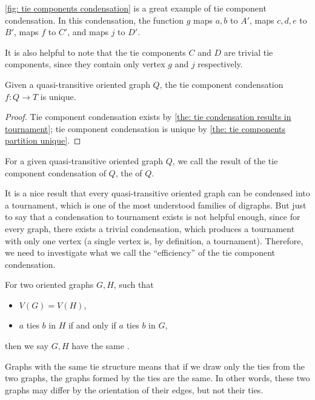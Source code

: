 \cref{fig: tie components condensation} is a great example of
tie component condensation.
In this condensation, the function \(g\) maps \(a, b\) to \(A'\),
maps \(c, d, e\) to \(B'\), maps \(f\) to \(C'\),
and maps \(j\) to \(D'\).

It is also helpful to note that the tie components \(C\) and \(D\)
are trivial tie components,
since they contain only vertex \(g\) and \(j\) respectively.

\begin{corollary}\label{the: tie component condensation unique}
  Given a quasi-transitive oriented graph \(Q\),
  the tie component condensation
  \(f: Q \to T\) is unique.
\end{corollary}
\begin{proof}
  Tie component condensation exists by
  \cref{the: tie condensation results in tournament};
  tie component condensation is unique
  by \cref{the: tie components partition unique}.
\end{proof}

\begin{definition}
  For a given quasi-transitive oriented graph \(Q\),
  we call the result of the tie component condensation of \(Q\),
  the  of \(Q\).
\end{definition}

It is a nice result that every
quasi-transitive oriented graph
can be condensed into a tournament,
which is one of the most understood families of digraphs.
But just to say that a condensation to tournament exists
is not helpful enough,
since for every graph, there exists a trivial condensation,
which produces a tournament with only one vertex
(a single vertex is, by definition, a tournament).
Therefore, we need to investigate what we call
the ``efficiency'' of the tie component condensation.

\begin{definition}
  For two oriented graphs \(G, H\), such that
  \begin{itemize}
    \item \(V(G) = V(H)\),
    \item \(a\) ties \(b\) in \(H\) if and only if
      \(a\) ties \(b\) in \(G\),
  \end{itemize}
  then we say \(G, H\) have the same .
\end{definition}

Graphs with the same tie structure means
that if we draw only the ties from the two graphs,
the graphs formed by the ties are the same.
In other words, these two graphs may differ
by the orientation of their edges, but not their ties.

